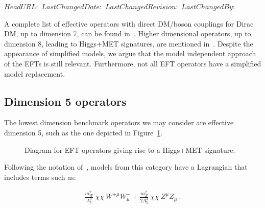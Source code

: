 \svnidlong
{$HeadURL: $}
{$LastChangedDate: $}
{$LastChangedRevision: $}
{$LastChangedBy: $}


A complete list of effective operators with direct DM/boson couplings for
Dirac DM, up to dimension 7, can be found in~\cite{Cotta:2012nj, Carpenter:2012rg, Crivellin:2015wva}. 
Higher dimensional operators, up to dimension 8, leading to Higgs+MET signatures,
are mentioned in~\cite{Carpenter:2012rg, Berlin:2014cfa}.
Despite the appearance of simplified models, we argue that
the model independent approach of the EFTs is still relevant.
Furthermore, not all EFT operators have a simplified model
replacement.


\subsection{Dimension 5 operators}
\label{sub:EW_EFT_Dim5}

The lowest dimension benchmark operators we may consider are effective dimension 5,
such as the one depicted in Figure~\ref{fig:modelMonoHEFT}.  

\begin{figure}[!htb]
	\centering
	\textwidth
	\begin{feynmandiagram}[modelMonoHEFT]
	\end{feynmandiagram}
	\caption{Diagram for EFT operators giving rise to a Higgs+MET signature.}
	\label{fig:modelMonoHEFT}
\end{figure}

Following the notation of~\cite{Carpenter:2012rg},  models
from this category have a Lagrangian that includes terms such as:

\begin{eqnarray}
\frac{m_W^2}{\Lambda_5^3} ~\bar{\chi} \chi ~W^{+ \mu} W^{-}_\mu
+ \frac{m_Z^2}{2 \Lambda_5^3} ~ \bar{\chi} \chi ~ Z^\mu Z_\mu ~.
\end{eqnarray}

